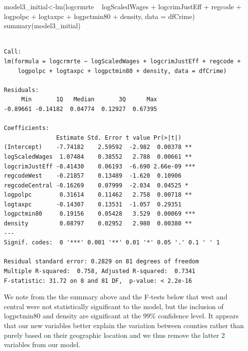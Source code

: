 \documentclass[]{article}
\newenvironment{Shaded}{}{}
\newcommand{\DataTypeTok}[1]{#1}
\newcommand{\KeywordTok}[1]{\textcolor[rgb]{0.00,0.00,1.00}{#1}}
\newcommand{\NormalTok}[1]{#1}
\newcommand{\OperatorTok}[1]{#1}
\newcommand{\StringTok}[1]{\textcolor[rgb]{0.00,0.50,0.50}{#1}}
\begin{document}
\begin{Shaded}
\begin{Highlighting}[]
\NormalTok{model3_initial<-}\KeywordTok{lm}\NormalTok{(logcrmrte }\OperatorTok{~}\StringTok{ }\NormalTok{logScaledWages }\OperatorTok{+}\StringTok{ }\NormalTok{logcrimJustEff   }\OperatorTok{+}\StringTok{  }\NormalTok{regcode }\OperatorTok{+}\StringTok{ }\NormalTok{logpolpc }\OperatorTok{+}\StringTok{ }\NormalTok{logtaxpc }\OperatorTok{+}\StringTok{ }\NormalTok{logpctmin80 }\OperatorTok{+}\StringTok{ }\NormalTok{density, }\DataTypeTok{data =}\NormalTok{ dfCrime)}
\KeywordTok{summary}\NormalTok{(model3_initial)}
\end{Highlighting}
\end{Shaded}

\begin{verbatim}

Call:
lm(formula = logcrmrte ~ logScaledWages + logcrimJustEff + regcode + 
    logpolpc + logtaxpc + logpctmin80 + density, data = dfCrime)

Residuals:
     Min       1Q   Median       3Q      Max 
-0.89661 -0.14182  0.04774  0.12927  0.67395 

Coefficients:
               Estimate Std. Error t value Pr(>|t|)    
(Intercept)    -7.74182    2.59592  -2.982  0.00378 ** 
logScaledWages  1.07484    0.38552   2.788  0.00661 ** 
logcrimJustEff -0.41430    0.06193  -6.690 2.66e-09 ***
regcodeWest    -0.21857    0.13489  -1.620  0.10906    
regcodeCentral -0.16269    0.07999  -2.034  0.04525 *  
logpolpc        0.31614    0.11462   2.758  0.00718 ** 
logtaxpc       -0.14307    0.13531  -1.057  0.29351    
logpctmin80     0.19156    0.05428   3.529  0.00069 ***
density         0.08797    0.02952   2.980  0.00380 ** 
---
Signif. codes:  0 '***' 0.001 '**' 0.01 '*' 0.05 '.' 0.1 ' ' 1

Residual standard error: 0.2829 on 81 degrees of freedom
Multiple R-squared:  0.758, Adjusted R-squared:  0.7341 
F-statistic: 31.72 on 8 and 81 DF,  p-value: < 2.2e-16
\end{verbatim}

We note from the the summary above and the F-tests below that west and
central were not statistically significant to the model, but the
inclusion of logpctmin80 and density are significant at the 99\%
confidence level. It appears that our new variables better explain the
variation between counties rather than purely based on their geographic
location and we thus remove the latter 2 variables from our model.
\end{document}
